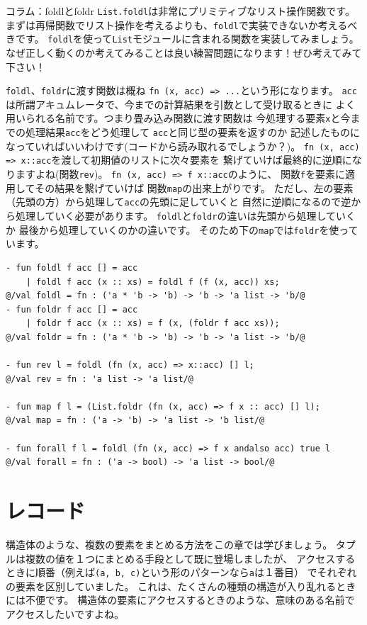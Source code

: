 \documentclass[11pt,a4paper]{article}
\begin{document}
\begin{itembox}[l]{コラム：foldlとfoldr}
  \lstinline{List.foldl}は非常にプリミティブなリスト操作関数です。
  まずは再帰関数でリスト操作を考えるよりも、\lstinline{foldl}で実装できないか考えるべきです。
  \lstinline{foldl}を使って\lstinline{List}モジュールに含まれる関数を実装してみましょう。
  なぜ正しく動くのか考えてみることは良い練習問題になります！ぜひ考えてみて下さい！

  \lstinline{foldl}、\lstinline{foldr}に渡す関数は概ね
  \lstinline{fn (x, acc) => ...}という形になります。
  \lstinline{acc}は所謂アキュムレータで、今までの計算結果を引数として受け取るときに
  よく用いられる名前です。つまり畳み込み関数に渡す関数は
  今処理する要素\lstinline{x}と今までの処理結果\lstinline{acc}をどう処理して
  \lstinline{acc}と同じ型の要素を返すのか
  記述したものになっていればいいわけです(コードから読み取れるでしょうか？)。
  \lstinline{fn (x, acc) => x::acc}を渡して初期値のリストに次々要素を
  繋げていけば最終的に逆順になりますよね(関数\lstinline{rev})。
  \lstinline{fn (x, acc) => f x::acc}のように、
  関数\lstinline{f}を要素に適用してその結果を繋げていけば
  関数\lstinline{map}の出来上がりです。
  ただし、左の要素（先頭の方）から処理して\lstinline{acc}の先頭に足していくと
  自然に逆順になるので逆から処理していく必要があります。
  \lstinline{foldl}と\lstinline{foldr}の違いは先頭から処理していくか
  最後から処理していくのかの違いです。
  そのため下の\lstinline{map}では\lstinline{foldr}を使っています。

\begin{lstlisting}
- fun foldl f acc [] = acc
    | foldl f acc (x :: xs) = foldl f (f (x, acc)) xs;
@/val foldl = fn : ('a * 'b -> 'b) -> 'b -> 'a list -> 'b/@
- fun foldr f acc [] = acc
    | foldr f acc (x :: xs) = f (x, (foldr f acc xs));
@/val foldr = fn : ('a * 'b -> 'b) -> 'b -> 'a list -> 'b/@

- fun rev l = foldl (fn (x, acc) => x::acc) [] l;
@/val rev = fn : 'a list -> 'a list/@

- fun map f l = (List.foldr (fn (x, acc) => f x :: acc) [] l);
@/val map = fn : ('a -> 'b) -> 'a list -> 'b list/@

- fun forall f l = foldl (fn (x, acc) => f x andalso acc) true l
@/val forall = fn : ('a -> bool) -> 'a list -> bool/@
\end{lstlisting}
\end{itembox}

\section{レコード}
\label{sec:record}
構造体のような、複数の要素をまとめる方法をこの章では学びましょう。
タプルは複数の値を１つにまとめる手段として既に登場しましたが、
アクセスするときに順番（例えば\lstinline{(a, b, c)}という形のパターンなら\lstinline{a}は１番目）
でそれぞれの要素を区別していました。
これは、たくさんの種類の構造が入り乱れるときには不便です。
構造体の要素にアクセスするときのような、意味のある名前でアクセスしたいですよね。
\end{document}
